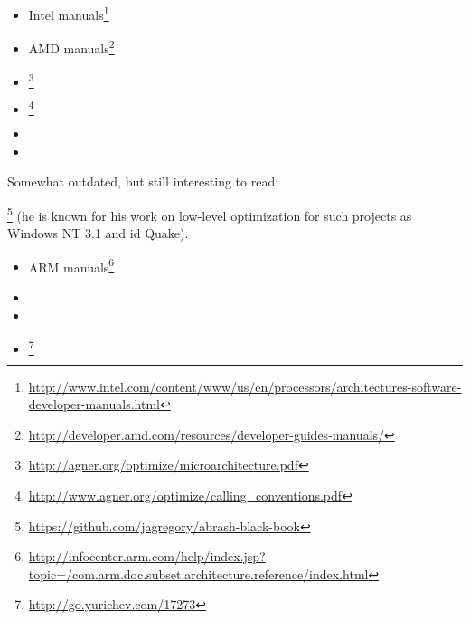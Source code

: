 







\sectionold{\CCpp}




\label{x86_manuals}
\begin{itemize}
\item Intel manuals\footnote{\AlsoAvailableAs \url{http://www.intel.com/content/www/us/en/processors/architectures-software-developer-manuals.html}}

\item AMD manuals\footnote{\AlsoAvailableAs \url{http://developer.amd.com/resources/developer-guides-manuals/}}

\item \AgnerFog{}\footnote{\AlsoAvailableAs \url{http://agner.org/optimize/microarchitecture.pdf}}

\item \AgnerFogCC{}\footnote{\AlsoAvailableAs \url{http://www.agner.org/optimize/calling_conventions.pdf}}

\item \IntelOptimization

\item \AMDOptimization
\end{itemize}

Somewhat outdated, but still interesting to read:

\MAbrash\footnote{\AlsoAvailableAs \url{https://github.com/jagregory/abrash-black-book}}
(he is known for his work on low-level optimization for such projects as Windows NT 3.1 and id Quake).


\begin{itemize}
\item ARM manuals\footnote{\AlsoAvailableAs \url{http://infocenter.arm.com/help/index.jsp?topic=/com.arm.doc.subset.architecture.reference/index.html}}

\item \ARMSevenRef

\item \ARMSixFourRefURL

\item \ARMCookBook\footnote{\AlsoAvailableAs \url{http://go.yurichev.com/17273}}
\end{itemize}

